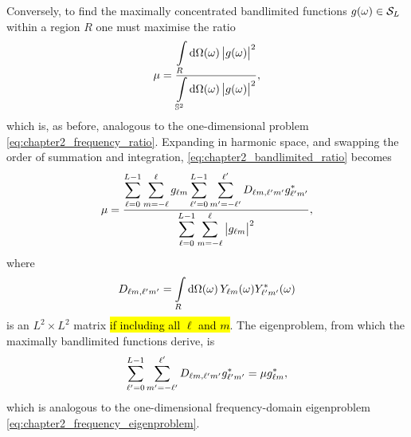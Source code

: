 Conversely, to find the maximally concentrated bandlimited functions \(\pixel{g} \in \spaceBandlimit{}\) within a region \(R\) one must maximise the ratio
%
\begin{equation}\label{eq:chapter2_bandlimited_ratio}
	\mu
	= \frac{\integrateRegion{\sphereVolume} \abs{\pixel{g}}^{2}}
	{\integrateSphere{\omega} \abs{\pixel{g}}^{2}},
\end{equation}
%
which is, as before, analogous to the one-dimensional problem \cref{eq:chapter2_frequency_ratio}.
Expanding in harmonic space, and swapping the order of summation and integration, \cref{eq:chapter2_bandlimited_ratio} becomes
%
\begin{equation}
	\mu
	= \frac{\displaystyle\sum\limits_{\ell=0}^{L-1} \sum\limits_{m=-\ell}^{\ell} \harmonic{g}
		\sum\limits_{\ell'=0}^{L-1} \sum\limits_{m'=-\ell'}^{\ell'} \Dmatrix \conj{\harmonic[']{g}}}
	{\displaystyle\sum\limits_{\ell=0}^{L-1} \sum\limits_{m=-\ell}^{\ell} \abs{\harmonic{g}}^{2}},
\end{equation}
%
where
%
\begin{equation}
	\Dmatrix
	= \integrateRegion{\sphereVolume} \pixel{\harmonic{Y}} \pixel{\conj{\harmonic[']{Y}}}
\end{equation}
%
is an \(L^{2} \times L^{2}\) matrix \hl{if including all \mbox{\(\ell{}\)} and \mbox{\(m\)}}.
The eigenproblem, from which the maximally bandlimited functions derive, is
%
\begin{equation}\label{eq:chapter2_harmonic_eigenproblem}
	\sum\limits_{\ell'=0}^{L-1} \sum\limits_{m'=-\ell'}^{\ell'} \Dmatrix \conj{\harmonic[']{g}}
	= \mu \conj{\harmonic{g}},
\end{equation}
%
which is analogous to the one-dimensional frequency-domain eigenproblem \cref{eq:chapter2_frequency_eigenproblem}.

